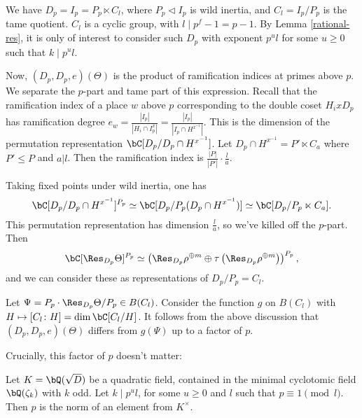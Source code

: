 We have $D_p = I_p = P_p \ltimes C_l$, where $P_p \triangleleft I_p$ is wild inertia, and $C_l = I_p / P_p$ is the tame quotient. $C_l$ is a cyclic group, with $l \mid p^f - 1 = p - 1$. By Lemma \ref{rational-res}, it is only of interest to consider such $D_p$ with exponent  $p^u l$ for some $u \geq 0$ such that $k \mid p^u l$.

Now, $(D_p, D_p, e)(\Theta)$ is the product of ramification indices at primes above $p$. We separate the $p$-part and tame part of this expression.
Recall that the ramification index of a place $w$ above $p$ corresponding to the double coset $H_i x D_p$ has ramification degree $e_w = \frac{|I_p|}{|H_i \cap I_p^x|} =\frac{|I_p|}{|I_p \cap H^{x^{-1}}|}$.
This is the dimension of the permutation representation $\bC[D_p / D_p \cap H^{x^{-1}}]$.
Let  $D_p \cap H^{x^{-1}} = P' \ltimes C_a$ where $P' \leq P$ and $a | l$. Then the ramification index is $\frac{|P|}{|P'|}\cdot \frac{l}{a}$. 

Taking fixed points under wild inertia, one has $$\bC[D_p / D_p \cap H^{x^{-1}}]^{P_p} \simeq \bC[D_p / P_p (D_p \cap H^{x^{-1}})] \simeq \bC[D_p / P_p \ltimes C_a].$$ This permutation representation has dimension $\frac{l}{a}$, so we've killed off the $p$-part. 
Then $$\bC[\Res_{D_p} \Theta]^{P_p} \simeq \left(\Res_{D_p} \rho^{\oplus m} \oplus \tau\left(\Res_{D_p}\rho^{\oplus m}\right)\right)^{P_p},$$
and we can consider these as representations of $D_p / P_p = C_l$.

Let $\Psi = P_p \cdot \Res_{D_p}\Theta / P_p \in B(C_l)$.
Consider the function $g$ on $B(C_l)$ with $H \mapsto [C_l \colon H] = \dim \bC[C_l / H]$. 
It follows from the above discussion that $(D_p, D_p, e)(\Theta)$ differs from $g(\Psi)$ up to a factor of $p$. 


Crucially, this factor of $p$ doesn't matter:

\begin{lemma}
    Let $K = \bQ(\sqrt{D})$ be a quadratic field, contained in the minimal cyclotomic field $\bQ(\zeta_k)$ with $k$ odd. Let $k \mid p^u l $, for some $u \geq 0$ and $l$ such that $p \equiv 1 \pmod l$. Then $p$ is the norm of an element from $K^{\times}$.
\end{lemma}

